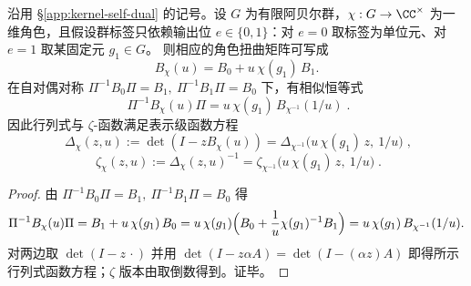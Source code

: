 \begin{proposition}\label{prop:kernel-self-dual-character}
沿用 \S\ref{app:kernel-self-dual} 的记号。设 \(G\) 为有限阿贝尔群，\(\chi:G\to\CC^\times\) 为一维角色，且假设群标签只依赖输出位 \(e\in\{0,1\}\)：对 \(e=0\) 取标签为单位元、对 \(e=1\) 取某固定元 \(g_1\in G\)。
则相应的角色扭曲矩阵可写成
\[
B_\chi(u)=B_0+u\,\chi(g_1)\,B_1.
\]
在自对偶对称 \(\Pi^{-1}B_0\Pi=B_1,\ \Pi^{-1}B_1\Pi=B_0\) 下，有相似恒等式
\[
\boxed{\;
\Pi^{-1}B_\chi(u)\Pi
=u\,\chi(g_1)\,B_{\chi^{-1}}(1/u)\; }.
\]
因此行列式与 \(\zeta\)-函数满足表示级函数方程
\[
\boxed{\;
\Delta_\chi(z,u):=\det(I-zB_\chi(u))
=\Delta_{\chi^{-1}}\!\bigl(u\,\chi(g_1)\,z,\ 1/u\bigr)\; },
\]
\[
\boxed{\;
\zeta_\chi(z,u):=\Delta_\chi(z,u)^{-1}
=\zeta_{\chi^{-1}}\!\bigl(u\,\chi(g_1)\,z,\ 1/u\bigr)\; }.
\]
\end{proposition}
\begin{proof}
由 \(\Pi^{-1}B_0\Pi=B_1,\ \Pi^{-1}B_1\Pi=B_0\) 得
\[
\Pi^{-1}B_\chi(u)\Pi
=B_1+u\,\chi(g_1)\,B_0
=u\,\chi(g_1)\Bigl(B_0+\frac{1}{u}\chi(g_1)^{-1}B_1\Bigr)
=u\,\chi(g_1)\,B_{\chi^{-1}}(1/u).
\]
对两边取 \(\det(I-z\,\cdot)\) 并用 \(\det(I-z\alpha A)=\det(I-(\alpha z)A)\) 即得所示行列式函数方程；\(\zeta\) 版本由取倒数得到。证毕。
\end{proof}

